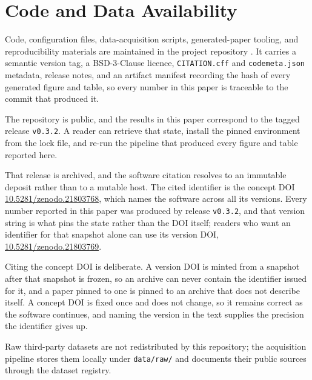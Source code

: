 \documentclass[11pt]{article}
\begin{document}







\FloatBarrier

\FloatBarrier

\FloatBarrier

\section*{Code and Data Availability}

Code, configuration files, data-acquisition scripts, generated-paper tooling, and reproducibility materials are maintained in the project repository \citep{Ribeiro2026DynEvtPdmRepository}. It carries a semantic version tag, a BSD-3-Clause licence, \texttt{CITATION.cff} and \texttt{codemeta.json} metadata, release notes, and an artifact manifest recording the hash of every generated figure and table, so every number in this paper is traceable to the commit that produced it.

The repository is public, and the results in this paper correspond to the tagged release \texttt{v0.3.2}. A reader can retrieve that state, install the pinned environment from the lock file, and re-run the pipeline that produced every figure and table reported here.

That release is archived, and the software citation resolves to an immutable deposit rather than to a mutable host. The cited identifier is the concept DOI \href{https://doi.org/10.5281/zenodo.21803768}{10.5281/zenodo.21803768}, which names the software across all its versions. Every number reported in this paper was produced by release \texttt{v0.3.2}, and that version string is what pins the state rather than the DOI itself; readers who want an identifier for that snapshot alone can use its version DOI, \href{https://doi.org/10.5281/zenodo.21803769}{10.5281/zenodo.21803769}.

Citing the concept DOI is deliberate. A version DOI is minted from a snapshot after that snapshot is frozen, so an archive can never contain the identifier issued for it, and a paper pinned to one is pinned to an archive that does not describe itself. A concept DOI is fixed once and does not change, so it remains correct as the software continues, and naming the version in the text supplies the precision the identifier gives up.

Raw third-party datasets are not redistributed by this repository; the acquisition pipeline stores them locally under \texttt{data/raw/} and documents their public sources through the dataset registry.

\FloatBarrier


\end{document}

